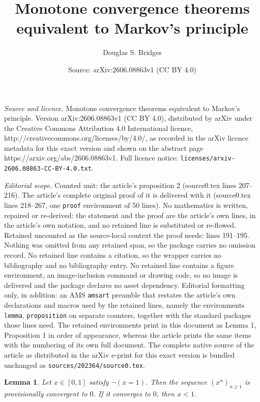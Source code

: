 \documentclass[10pt,a4paper]{amsart}
\title{\textsf{Monotone convergence theorems equivalent to Markov's principle}}
\author{Douglas S. Bridges}
\date{Source: arXiv:2606.08863v1 (CC BY 4.0)}
\newtheorem{lemma}{Lemma}
\begin{document}
\maketitle

\noindent\emph{Source and licence.} \textsf{Monotone convergence theorems equivalent to Markov's principle}. Version arXiv:2606.08863v1 (CC BY 4.0), distributed by arXiv under the Creative Commons Attribution 4.0 International licence, http://creativecommons.org/licenses/by/4.0/, as recorded in the arXiv licence metadata for this exact version and shown on the abstract page https://arxiv.org/abs/2606.08863v1. Full licence notice: \texttt{licenses/arxiv-2606.08863-CC-BY-4.0.txt}.\par\smallskip

\noindent\textit{Editorial scope.} Counted unit: the article's proposition 2 (source0.tex lines 207--216). The article's complete original proof of it is delivered with it (source0.tex lines 218--267, one \texttt{proof} environment of 50 lines). No mathematics is written, repaired or re-derived: the statement and the proof are the article's own lines, in the article's own notation, and no retained line is substituted or re-flowed.  Retained uncounted as the source-local context the proof needs: lines 191--195.  Nothing was omitted from any retained span, so the package carries no omission record.  No retained line contains a citation, so the wrapper carries no bibliography and no bibliography entry.  No retained line contains a figure environment, an image-inclusion command or drawing code, so no image is delivered and the package declares no asset dependency.  Editorial formatting only, in addition: an AMS \texttt{amsart} preamble that restates the article's own declarations and macros used by the retained lines, namely the environments \texttt{lemma}, \texttt{proposition} on separate counters, together with the standard packages those lines need.  The retained environments print in this document as Lemma 1, Proposition 1 in order of appearance, whereas the article prints the same items with the numbering of its own full document.  The complete native source of the article as distributed in the arXiv e-print for this exact version is bundled unchanged as \texttt{sources/202364/source0.tex}.
\begin{lemma}
\label{130511a3}Let $x\in\left[  0,1\right]  $ satisfy $\lnot\left(
x=1\right)  $. Then the sequence $\left(  x^{n}\right)  _{n\geqslant1}$ is
provisionally convergent to $0$. If it converges to $0$, then $x<1$.
\end{lemma}
\end{document}
